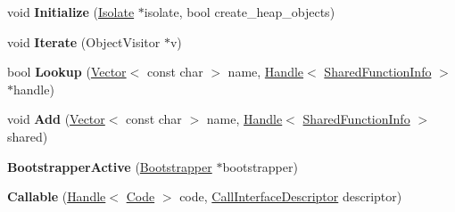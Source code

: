 \begin{DoxyCompactItemize}
\item 
void {\bfseries Initialize} (\hyperlink{classv8_1_1internal_1_1_isolate}{Isolate} $\ast$isolate, bool create\+\_\+heap\+\_\+objects)\hypertarget{classv8_1_1internal_1_1_b_a_s_e___e_m_b_e_d_d_e_d_afc5432bea309ffc578ba79f0b27b39f5}{}\label{classv8_1_1internal_1_1_b_a_s_e___e_m_b_e_d_d_e_d_afc5432bea309ffc578ba79f0b27b39f5}

\item 
void {\bfseries Iterate} (Object\+Visitor $\ast$v)\hypertarget{classv8_1_1internal_1_1_b_a_s_e___e_m_b_e_d_d_e_d_af1d9d5f694a342b6e76ae0b28e91e76b}{}\label{classv8_1_1internal_1_1_b_a_s_e___e_m_b_e_d_d_e_d_af1d9d5f694a342b6e76ae0b28e91e76b}

\item 
bool {\bfseries Lookup} (\hyperlink{classv8_1_1internal_1_1_vector}{Vector}$<$ const char $>$ name, \hyperlink{classv8_1_1internal_1_1_handle}{Handle}$<$ \hyperlink{classv8_1_1internal_1_1_shared_function_info}{Shared\+Function\+Info} $>$ $\ast$handle)\hypertarget{classv8_1_1internal_1_1_b_a_s_e___e_m_b_e_d_d_e_d_a98d77c36f9bdc6bd4de810b7469906d2}{}\label{classv8_1_1internal_1_1_b_a_s_e___e_m_b_e_d_d_e_d_a98d77c36f9bdc6bd4de810b7469906d2}

\item 
void {\bfseries Add} (\hyperlink{classv8_1_1internal_1_1_vector}{Vector}$<$ const char $>$ name, \hyperlink{classv8_1_1internal_1_1_handle}{Handle}$<$ \hyperlink{classv8_1_1internal_1_1_shared_function_info}{Shared\+Function\+Info} $>$ shared)\hypertarget{classv8_1_1internal_1_1_b_a_s_e___e_m_b_e_d_d_e_d_a20b547df67aab8f08c25e630df0a561b}{}\label{classv8_1_1internal_1_1_b_a_s_e___e_m_b_e_d_d_e_d_a20b547df67aab8f08c25e630df0a561b}

\item 
{\bfseries Bootstrapper\+Active} (\hyperlink{classv8_1_1internal_1_1_bootstrapper}{Bootstrapper} $\ast$bootstrapper)\hypertarget{classv8_1_1internal_1_1_b_a_s_e___e_m_b_e_d_d_e_d_a0630fdc479794d8f1e016657491ee4e1}{}\label{classv8_1_1internal_1_1_b_a_s_e___e_m_b_e_d_d_e_d_a0630fdc479794d8f1e016657491ee4e1}

\item 
{\bfseries Callable} (\hyperlink{classv8_1_1internal_1_1_handle}{Handle}$<$ \hyperlink{classv8_1_1internal_1_1_code}{Code} $>$ code, \hyperlink{classv8_1_1internal_1_1_call_interface_descriptor}{Call\+Interface\+Descriptor} descriptor)\hypertarget{classv8_1_1internal_1_1_b_a_s_e___e_m_b_e_d_d_e_d_a61d891262bdd7370d98d7563e89e3cad}{}\label{classv8_1_1internal_1_1_b_a_s_e___e_m_b_e_d_d_e_d_a61d891262bdd7370d98d7563e89e3cad}


\end{DoxyCompactItemize}
